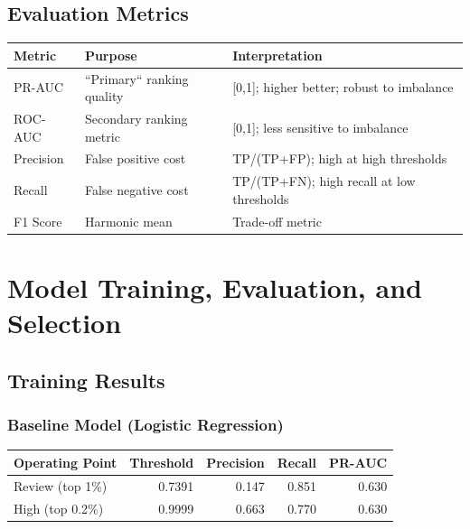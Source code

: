 \documentclass[12pt,a4paper]{article}
\begin{document}
\subsection{Evaluation Metrics}

\begin{table}[H]
\centering
\small
\begin{tabular}{|l|p{3cm}|p{3.5cm}|}
\hline
\textbf{Metric} & \textbf{Purpose} & \textbf{Interpretation} \\
\hline
PR-AUC & ``Primary`` ranking quality & [0,1]; higher better; robust to imbalance \\
ROC-AUC & Secondary ranking metric & [0,1]; less sensitive to imbalance \\
Precision & False positive cost & TP/(TP+FP); high at high thresholds \\
Recall & False negative cost & TP/(TP+FN); high recall at low thresholds \\
F1 Score & Harmonic mean & Trade-off metric \\
\hline
\end{tabular}
\end{table}

\section{Model Training, Evaluation, and Selection}

\subsection{Training Results}

\subsubsection{Baseline Model (Logistic Regression)}

\begin{table}[H]
\centering
\begin{tabular}{|p{2.5cm}|r|r|r|r|}
\hline
\textbf{Operating Point} & \textbf{Threshold} & \textbf{Precision} & \textbf{Recall} & \textbf{PR-AUC} \\
\hline
Review (top 1\%) & 0.7391 & 0.147 & 0.851 & 0.630 \\
High (top 0.2\%) & 0.9999 & 0.663 & 0.770 & 0.630 \\
\hline
\end{tabular}
\end{table}
\end{document}
